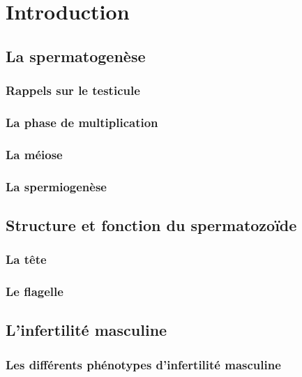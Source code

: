 \documentclass[12pt,a4paper,twoside]{ugathesis}
\begin{document}
\chapter{Introduction}\label{introInf}

\section{La spermatogenèse}\label{la-spermatogenese}

\subsection{Rappels sur le testicule}\label{rappels-sur-le-testicule}

\subsection{La phase de
multiplication}\label{la-phase-de-multiplication}

\subsection{La méiose}\label{meiose}

\subsection{La spermiogenèse}\label{spermiogenese}

\section{Structure et fonction du
spermatozoïde}\label{structure-et-fonction-du-spermatozoide}

\subsection{La tête}\label{la-tete}

\subsection{Le flagelle}\label{le-flagelle}

\section{L'infertilité masculine}\label{linfertilite-masculine}

\subsection{Les différents phénotypes d'infertilité
masculine}\label{les-differents-phenotypes-dinfertilite-masculine}
\end{document}
